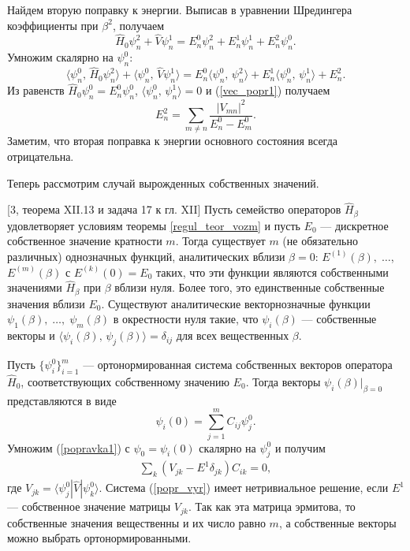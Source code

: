 \documentclass[a4paper
]{article}
\begin{document}
Найдем вторую поправку к энергии. Выписав в уравнении
Шредингера коэффициенты при $\beta^2$, получаем $$\hat H_0\psi_n^2
+\hat V\psi_n^1=E_n^0\psi_n^2+E_n^1\psi_n^1+E_n^2\psi_n^0.$$ Умножим скалярно
на $\psi_n^0$: $$\langle \psi_n^0, \, \hat H_0\psi_n^2\rangle+\langle
\psi_n^0, \, \hat V\psi_n^1\rangle=E_n^0\langle \psi_n^0, \, \psi_n^2
\rangle+E_n^1\langle \psi_n^0, \, \psi_n^1\rangle+E_n^2.$$ Из равенств
$\hat H_0\psi_n^0=E_n^0\psi_n^0$, $\langle \psi_n^0, \, \psi_n^1\rangle=0$
и (\ref{vec_popr1}) получаем
$$E_n^2=\sum \limits_{m\ne n}\frac{|V_{mn}|^2}{E_n^0-E_m^0}.$$ Заметим, что
вторая поправка к энергии основного состояния всегда отрицательна. \par
Теперь рассмотрим случай вырожденных собственных значений.
\begin{Trm}
{\rm [3, теорема XII.13 и задача 17 к гл. XII]}
Пусть семейство операторов $\hat H_\beta$ удовлетворяет условиям теоремы
\ref{regul_teor_vozm} и пусть $E_0$ --- дискретное собственное значение
кратности $m$. Тогда существует $m$ (не обязательно различных) однозначных
функций, аналитических вблизи $\beta=0$: $E^{(1)}(\beta), \; \dots$,
$E^{(m)}(\beta)$ с $E^{(k)}(0)=E_0$ таких, что эти функции являются
собственными значениями $\hat H_\beta$ при $\beta$ вблизи нуля. Более того,
это единственные собственные значения вблизи $E_0$. Существуют аналитические
векторнозначные функции $\psi_1(\beta), \; \dots, \; \psi_m(\beta)$ в
окрестности нуля такие, что $\psi_i(\beta)$ --- собственные векторы и
$\langle\psi_i(\beta), \, \psi_j(\beta)\rangle=\delta_{ij}$ для всех вещественных
$\beta$.
\end{Trm}
Пусть $\{\psi^0_i\}_{i=1}^m$ --- ортонормированная система собственных
векторов оператора $\hat H_0$, соответствующих собственному значению
$E_0$. Тогда векторы $\psi_i(\beta)|_{\beta=0}$ представляются в виде
$$\psi_i(0)=\sum \limits_{j=1}^m C_{ij}\psi^0_j.$$ Умножим (\ref{popravka1})
с $\psi_0=\psi_i(0)$ скалярно на $\psi^0_j$ и получим
\begin{align}
\label{popr_vyr}
\sum \limits_k(V_{jk}-E^1\delta_{jk})C_{ik}=0,
\end{align}
где $V_{jk}=\langle \psi^0_j|\hat V|\psi^0_k\rangle$. Система (\ref{popr_vyr})
имеет нетривиальное решение, если $E^1$ --- собственное значение матрицы
$V_{jk}$. Так как эта матрица эрмитова, то собственные значения вещественны
и их число равно $m$, а собственные векторы можно выбрать ортонормированными.
\end{document}
